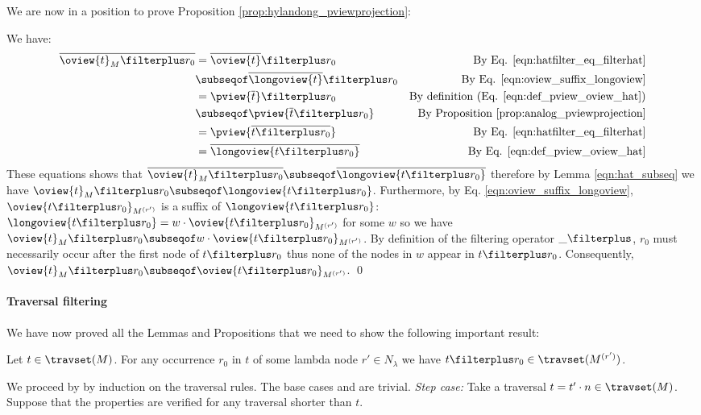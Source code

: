 We are now in a position to prove Proposition
\ref{prop:hylandong_pviewprojection}:


We have:
\begin{align*}
  \overline{\oview{t}_M\filterplus r_0}
        &= \overline{\oview{t}} \filterplus r_0 & \mbox{By Eq. \ref{eqn:hatfilter_eq_filterhat}} \\
        &\subseqof \overline{\longoview{t}} \filterplus r_0 & \mbox{By Eq. \ref{eqn:oview_suffix_longoview}} \\
        &= \pview{\overline{t}} \filterplus r_0 & \mbox{By definition (Eq. \ref{eqn:def_pview_oview_hat})} \\
        &\subseqof \pview{\overline{t} \filterplus r_0}  & \mbox{By Proposition \ref{prop:analog_pviewprojection}} \\
        &= \pview{\overline{t \filterplus r_0}}  & \mbox{By Eq. \ref{eqn:hatfilter_eq_filterhat}} \\
        &= \overline{\longoview{t \filterplus r_0}}  & \mbox{By Eq. \ref{eqn:def_pview_oview_hat}}
\end{align*}
These equations shows that $\overline{\oview{t}_M\filterplus r_0} \subseqof
\overline{\longoview{t \filterplus r_0}}$ therefore by Lemma
\ref{eqn:hat_subseq} we have $\oview{t}_M\filterplus r_0 \subseqof
\longoview{t \filterplus r_0}$. Furthermore, by Eq.
\ref{eqn:oview_suffix_longoview}, $\oview{t \filterplus
r_0}_{M^{(r')}}$ is a suffix of $\longoview{t \filterplus r_0}$:
$\longoview{t \filterplus r_0} = w \cdot \oview{t \filterplus
r_0}_{M^{(r')}}$ for some $w$ so we have $\oview{t}_M\filterplus r_0
\subseqof w \cdot \oview{t \filterplus r_0}_{M^{(r')}}$. By definition of the filtering operator $\_ \filterplus$, $r_0$ must
necessarily occur after the first node of $t \filterplus r_0$ thus
none of the nodes in $w$ appear in $t\filterplus r_0$. Consequently,
$\oview{t}_M\filterplus r_0 \subseqof \oview{t \filterplus
r_0}_{M^{(r')}}$. \qed

\paragraph{Traversal filtering}
We have now proved all the Lemmas and Propositions that we need to show the following important result:
\begin{proposition}
    \label{prop:trav_filtering}
    Let $t \in \travset(M)$. For any occurrence $r_0$ in $t$ of some lambda node
    $r'\in N_\lambda$ we have $t\filterplus r_0 \in \travset(M^{(r')})$.
\end{proposition}
\proof
    We proceed by by induction on the traversal rules. The base cases  and
     are trivial. \emph{Step case:} Take a traversal $t = t' \cdot n
    \in \travset(M)$. Suppose that the properties are
    verified for any traversal shorter than $t$.


